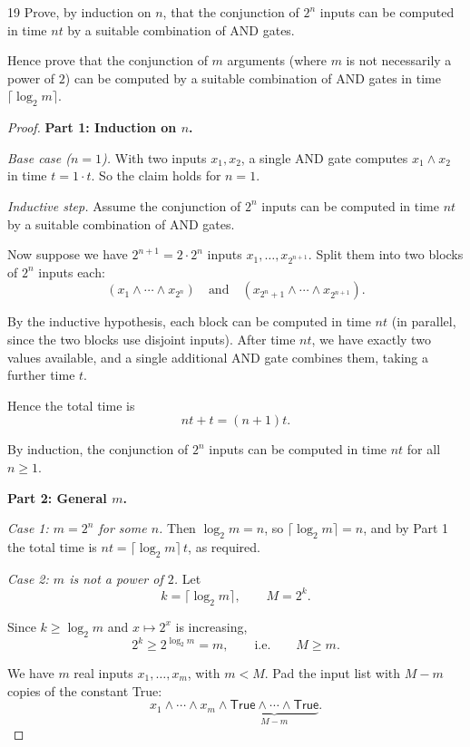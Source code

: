 \documentclass[11pt]{article}
\begin{document}
\begin{exercise}{19}
    Prove, by induction on $n$, that the conjunction of $2^n$ inputs
    can be computed in time $nt$ by a suitable combination of AND
    gates.

    Hence prove that the conjunction of $m$ arguments (where $m$ is
    not necessarily a power of $2$) can be computed by a suitable
    combination of AND gates in time $\lceil \log_2 m \rceil$.
\end{exercise}

\begin{proof}
\textbf{Part 1: Induction on $n$.}

\medskip
\noindent\textit{Base case ($n=1$).} With two inputs $x_1,x_2$, a single AND gate computes $x_1\wedge x_2$ in time $t = 1\cdot t$. So the claim holds for $n=1$.

\bigskip
\noindent\textit{Inductive step.} Assume the conjunction of $2^n$ inputs can be computed in time $nt$ by a suitable combination of AND gates.

Now suppose we have $2^{n+1}=2\cdot 2^n$ inputs $x_1,\dots,x_{2^{n+1}}$. Split them into two blocks of $2^n$ inputs each:
\[
(x_1\wedge\cdots\wedge x_{2^n}) \quad\text{and}\quad (x_{2^n+1}\wedge\cdots\wedge x_{2^{n+1}}).
\]

By the inductive hypothesis, each block can be computed in time $nt$ (in parallel, since the two blocks use disjoint inputs). After time $nt$, we have exactly two values available, and a single additional AND gate combines them, taking a further time $t$.

Hence the total time is
\[
nt + t = (n+1)t.
\]

By induction, the conjunction of $2^n$ inputs can be computed in time $nt$ for all $n\geq 1$.

\bigskip
\textbf{Part 2: General $m$.}

\medskip
\noindent\textit{Case 1: $m=2^n$ for some $n$.} Then $\log_2 m = n$, so $\lceil\log_2 m\rceil = n$, and by Part 1 the total time is $nt = \lceil\log_2 m\rceil\, t$, as required.

\bigskip
\noindent\textit{Case 2: $m$ is not a power of $2$.} Let
\[
k = \lceil \log_2 m\rceil, \qquad M = 2^k.
\]

Since $k\geq \log_2 m$ and $x\mapsto 2^x$ is increasing,
\[
2^k \geq 2^{\log_2 m} = m, \qquad\text{i.e.}\qquad M\geq m.
\]

We have $m$ real inputs $x_1,\dots,x_m$, with $m < M$. Pad the input list with $M-m$ copies of the constant \textsf{True}:
\[
x_1\wedge\cdots\wedge x_m\wedge\underbrace{\mathsf{True}\wedge\cdots\wedge\mathsf{True}}_{M-m}.
\]


\end{proof}
\end{document}
